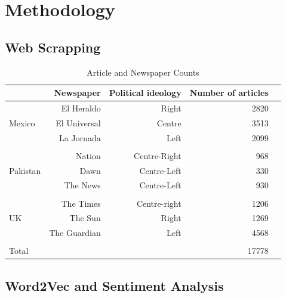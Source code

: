 \documentclass{article}
\begin{document}
\section{Methodology}{
	
\subsection{Web Scrapping}{
\begin{table}[!htp]\centering
	\caption{Article and Newspaper Counts}\label{tab: }
	\scriptsize
	\begin{tabular}{lrrrr}\toprule
		&\textbf{Newspaper} &\textbf{Political ideology} &\textbf{Number of articles} \\\midrule
		\multirow{3}{*}{Mexico} &El Heraldo &Right &2820 \\
		&El Universal &Centre &3513 \\
		&La Jornada &Left &2099 \\
		& & & \\
		\multirow{3}{*}{Pakistan} &Nation &Centre-Right &968 \\
		&Dawn &Centre-Left &330 \\
		&The News &Centre-Left &930 \\
		& & & \\
		\multirow{3}{*}{UK} &The Times &Centre-right &1206 \\
		&The Sun &Right &1269 \\
		&The Guardian &Left &4568 \\
		& & & \\
		Total & & &17778 \\
		\bottomrule
	\end{tabular}
\end{table}

}


\subsection{Word2Vec and Sentiment Analysis}{

}}
\end{document}
